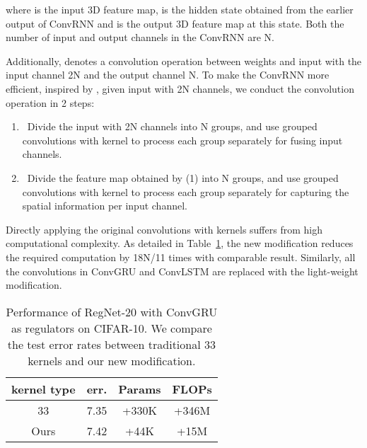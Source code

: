 \documentclass[journal,comsoc]{IEEEtran}
\begin{document}
where  is the input 3D feature map,  is the hidden state obtained from the earlier output of ConvRNN and  is the output 3D feature map at this state. Both the number of input  and output  channels in the ConvRNN are N.

Additionally,  denotes a convolution operation between weights  and input   with the input channel 2N and the output channel N. To make the ConvRNN more efficient, inspired by \cite{DBLP:journals/corr/abs-1903-10172,DBLP:conf/cvpr/2018},  given input  with 2N channels, we conduct the convolution operation in 2 steps:

\begin{enumerate}
\renewcommand{\labelenumi}{(\theenumi)}
\item ~Divide the input  with 2N channels into N groups, and use grouped convolutions\cite{DBLP:journals/corr/ZhangQ0W17} with  kernel to process each group separately for fusing input channels. 
\item ~Divide the feature map obtained by (1) into N groups, and use grouped convolutions with  kernel to process each group separately for capturing the spatial information per input channel. 
\end{enumerate}

Directly applying the original convolutions with  kernels suffers from high computational complexity. As detailed in Table~\ref{table:structure_compare}, the new modification reduces the required computation by 18N/11 times with comparable result. Similarly, all the convolutions in ConvGRU and ConvLSTM are replaced with the light-weight modification.



\begin{table}[t]
\caption{Performance of RegNet-20 with ConvGRU as regulators on CIFAR-10. We compare the test error rates between traditional 33 kernels and our new modification.}
\begin{center}
\begin{tabular}{c|c|c|c}
  \hline
kernel type  & err. & Params & FLOPs \\
\hline\hline
33   &  7.35  & +330K   & +346M   \\ \hline
              
Ours & 7.42 & +44K  & +15M    \\ \hline



\end{tabular}
\end{center}
\label{table:structure_compare}
\end{table}
\end{document}
